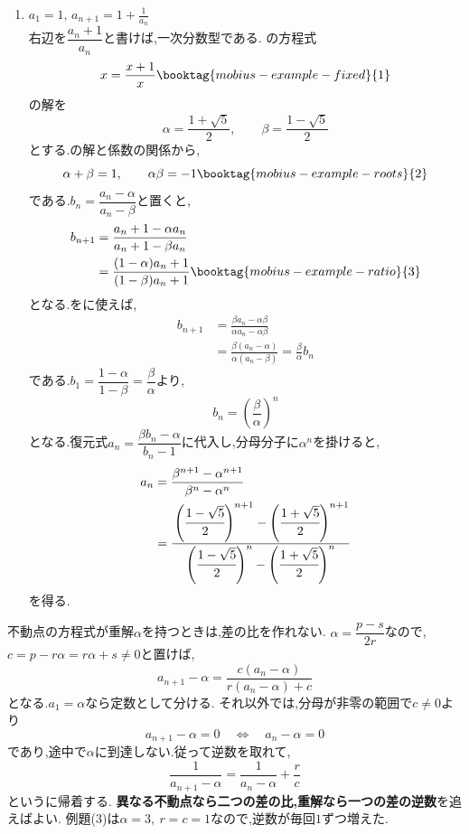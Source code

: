 \begin{enumerate}[label=(\arabic*),parsep=3pt,format=\bookitemlink{example-mobius-1}{solution}{problem}]
\begin{align*}
      &=\frac{b_n}{b_n+1},\quad b_1=2
    \end{align*}
    となる.正の$b_n$が続くので,$b_n$も元の分母$b_n+1$も零でない.
    逆数を取れば,
    \begin{align*}
      \frac1{b_{n+1}}&=\frac1{b_n}+1,\\
      \frac1{b_n}&=\frac12+(n-1)=\frac{2n-1}{2}
    \end{align*}
    である.従って,
    \[
      a_n=3+b_n=3+\frac2{2n-1}=\frac{6n-1}{2n-1}
    \]
    を得る.
  \item $\displaystyle a_1=1,\, a_{n+1}=1+\frac1{a_n}$\\
    右辺を$\dfrac{a_n+1}{a_n}$と書けば,一次分数型である.
    の方程式
    \[
      x=\frac{x+1}{x}\booktag{mobius-example-fixed}{1}
    \]
    の解を
    \[
      \alpha=\frac{1+\sqrt5}{2},\qquad
      \beta=\frac{1-\sqrt5}{2}
    \]
    とする.の解と係数の関係から,
    \[
      \alpha+\beta=1,\qquad \alpha\beta=-1
      \booktag{mobius-example-roots}{2}
    \]
    である.$b_n=\dfrac{a_n-\alpha}{a_n-\beta}$と置くと,
    \begin{align*}
      b_{n+1}&=\frac{a_n+1-\alpha a_n}{a_n+1-\beta a_n}\\
      &=\frac{(1-\alpha)a_n+1}{(1-\beta)a_n+1}
      \booktag{mobius-example-ratio}{3}
    \end{align*}
    となる.をに使えば,
    \begin{align*}
      b_{n+1}&=\frac{\beta a_n-\alpha\beta}{\alpha a_n-\alpha\beta}\\
      &=\frac{\beta(a_n-\alpha)}{\alpha(a_n-\beta)}
      =\frac\beta\alpha b_n
    \end{align*}
    である.$b_1=\dfrac{1-\alpha}{1-\beta}=\dfrac{\beta}{\alpha}$より,
    \[
      b_n=\left(\frac\beta\alpha\right)^n
    \]
    となる.復元式$a_n=\dfrac{\beta b_n-\alpha}{b_n-1}$に代入し,分母分子に$\alpha^n$を掛けると,
    \begin{align*}
      a_n&=\frac{\beta^{n+1}-\alpha^{n+1}}{\beta^n-\alpha^n}\\
      &=\cfrac{\left(\cfrac{1-\sqrt5}{2}\right)^{n+1}-\left(\cfrac{1+\sqrt5}{2}\right)^{n+1}}
      {\left(\cfrac{1-\sqrt5}{2}\right)^n-\left(\cfrac{1+\sqrt5}{2}\right)^n}
    \end{align*}
    を得る.
\end{enumerate}
不動点の方程式が重解$\alpha$を持つときは,差の比を作れない.
$\alpha=\dfrac{p-s}{2r}$なので,$c=p-r\alpha=r\alpha+s\ne0$と置けば,
\[
  a_{n+1}-\alpha
  =\frac{c(a_n-\alpha)}{r(a_n-\alpha)+c}
\]
となる.$a_1=\alpha$なら定数として分ける.
それ以外では,分母が非零の範囲で$c\ne0$より
\[
  a_{n+1}-\alpha=0
  \quad\Longleftrightarrow\quad a_n-\alpha=0
\]
であり,途中で$\alpha$に到達しない.従って逆数を取れて,
\[
  \frac1{a_{n+1}-\alpha}
  =\frac1{a_n-\alpha}+\frac rc
\]
というに帰着する.
\textbf{異なる不動点なら二つの差の比,重解なら一つの差の逆数}を追えばよい.
例題(3)は$\alpha=3,\ r=c=1$なので,逆数が毎回$1$ずつ増えた.

